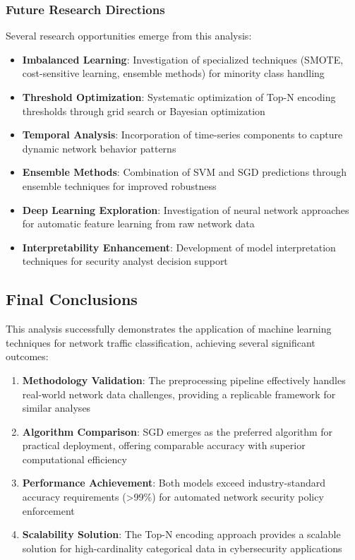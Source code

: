 \documentclass[12pt,a4paper]{article}
\begin{document}
\subsubsection{Future Research Directions}

Several research opportunities emerge from this analysis:

\begin{itemize}
    \item \textbf{Imbalanced Learning}: Investigation of specialized techniques (SMOTE, cost-sensitive learning, ensemble methods) for minority class handling
    \item \textbf{Threshold Optimization}: Systematic optimization of Top-N encoding thresholds through grid search or Bayesian optimization
    \item \textbf{Temporal Analysis}: Incorporation of time-series components to capture dynamic network behavior patterns
    \item \textbf{Ensemble Methods}: Combination of SVM and SGD predictions through ensemble techniques for improved robustness
    \item \textbf{Deep Learning Exploration}: Investigation of neural network approaches for automatic feature learning from raw network data
    \item \textbf{Interpretability Enhancement}: Development of model interpretation techniques for security analyst decision support
\end{itemize}

\subsection{Final Conclusions}

This analysis successfully demonstrates the application of machine learning techniques for network traffic classification, achieving several significant outcomes:

\begin{enumerate}
    \item \textbf{Methodology Validation}: The preprocessing pipeline effectively handles real-world network data challenges, providing a replicable framework for similar analyses
    \item \textbf{Algorithm Comparison}: SGD emerges as the preferred algorithm for practical deployment, offering comparable accuracy with superior computational efficiency
    \item \textbf{Performance Achievement}: Both models exceed industry-standard accuracy requirements (>99\%) for automated network security policy enforcement
    \item \textbf{Scalability Solution}: The Top-N encoding approach provides a scalable solution for high-cardinality categorical data in cybersecurity applications
\end{enumerate}
\end{document}
